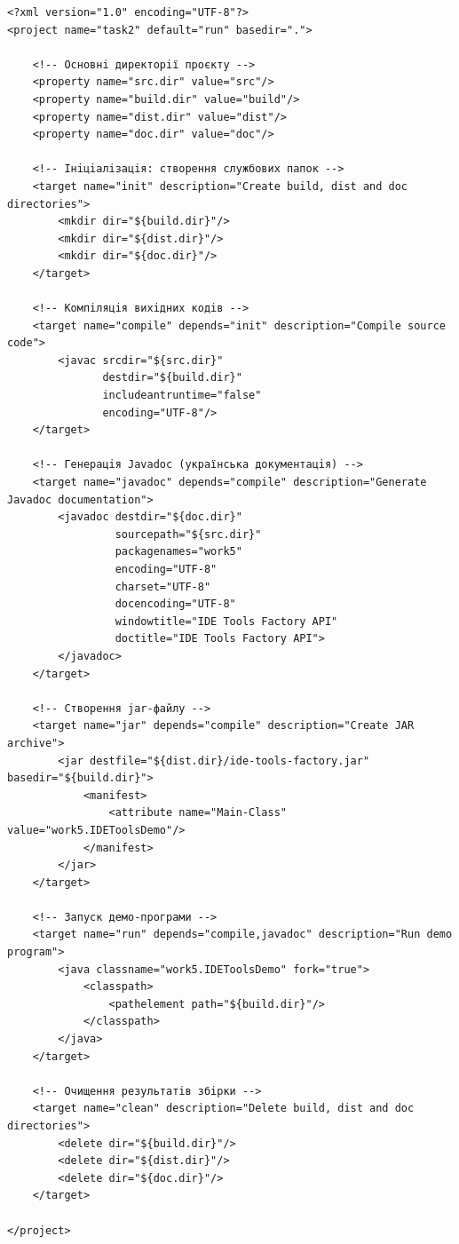 \documentclass[12pt,a4paper]{article}
\begin{document}
    \begin{verbatim}
<?xml version="1.0" encoding="UTF-8"?>
<project name="task2" default="run" basedir=".">

    <!-- Основнi директорiї проєкту -->
    <property name="src.dir" value="src"/>
    <property name="build.dir" value="build"/>
    <property name="dist.dir" value="dist"/>
    <property name="doc.dir" value="doc"/>

    <!-- Iнiцiалiзацiя: створення службових папок -->
    <target name="init" description="Create build, dist and doc directories">
        <mkdir dir="${build.dir}"/>
        <mkdir dir="${dist.dir}"/>
        <mkdir dir="${doc.dir}"/>
    </target>

    <!-- Компiляцiя вихiдних кодiв -->
    <target name="compile" depends="init" description="Compile source code">
        <javac srcdir="${src.dir}"
               destdir="${build.dir}"
               includeantruntime="false"
               encoding="UTF-8"/>
    </target>

    <!-- Генерацiя Javadoc (українська документацiя) -->
    <target name="javadoc" depends="compile" description="Generate Javadoc documentation">
        <javadoc destdir="${doc.dir}"
                 sourcepath="${src.dir}"
                 packagenames="work5"
                 encoding="UTF-8"
                 charset="UTF-8"
                 docencoding="UTF-8"
                 windowtitle="IDE Tools Factory API"
                 doctitle="IDE Tools Factory API">
        </javadoc>
    </target>

    <!-- Створення jar-файлу -->
    <target name="jar" depends="compile" description="Create JAR archive">
        <jar destfile="${dist.dir}/ide-tools-factory.jar" basedir="${build.dir}">
            <manifest>
                <attribute name="Main-Class" value="work5.IDEToolsDemo"/>
            </manifest>
        </jar>
    </target>

    <!-- Запуск демо-програми -->
    <target name="run" depends="compile,javadoc" description="Run demo program">
        <java classname="work5.IDEToolsDemo" fork="true">
            <classpath>
                <pathelement path="${build.dir}"/>
            </classpath>
        </java>
    </target>

    <!-- Очищення результатiв збiрки -->
    <target name="clean" description="Delete build, dist and doc directories">
        <delete dir="${build.dir}"/>
        <delete dir="${dist.dir}"/>
        <delete dir="${doc.dir}"/>
    </target>

</project>
    \end{verbatim}
\end{document}
